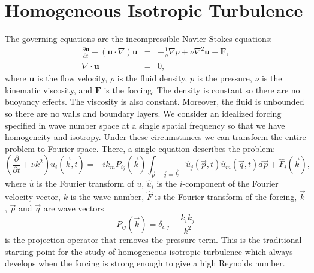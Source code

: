 \section{Homogeneous Isotropic Turbulence}

The governing equations are the incompressible Navier Stokes equations:
\begin{eqnarray}
    \frac{\partial\textbf{u}}{\partial t} + (\textbf{u}\cdot\nabla)\textbf{u} & = & -\frac{1}{\rho}\nabla p + \nu \nabla^2\textbf{u} + \textbf{F}, \\
    \nabla \cdot \textbf{u} & = & 0 , \label{eq: intro navier stokes}
\end{eqnarray}
where $\textbf{u}$ is the flow velocity, $\rho$ is the fluid density, $p$ is the pressure, $\nu$ is the kinematic viscosity, and $\textbf{F}$ is the forcing. The density is constant so there are no buoyancy effects. The viscosity is also constant.  Moreover, the fluid is unbounded so there are no walls and boundary layers.  We consider an idealized forcing specified in wave number space at a single spatial frequency so that we have homogeneity and isotropy.  Under these circumstances we can transform the entire problem to Fourier space.  There, a single equation describes the problem:
\begin{equation}
    \left(\frac{\partial}{\partial t} + \nu k^2\right)\hat{u}_i\left(\vec{k},t\right) = -ik_mP_{ij}\left(\vec{k}\right)\int_{\vec{p}+\vec{q} = \vec{k}}\hat{u}_j(\vec{p},t)\hat{u}_m(\vec{q},t)d\vec{p} + \hat{F}_i(\vec{k}), \label{eq: intro spectral navier stokes}
\end{equation}
where $\hat{u}$ is the Fourier transform of $u$, $\hat{u}_i$ is the $i$-component of the Fourier velocity vector, $k$ is the wave number, $\hat{F}$ is the Fourier transform of the forcing, $\vec{k}$, $\vec{p}$ and $\vec{q}$ are wave vectors
\begin{equation}
    P_{ij}\left(\vec{k}\right) = \delta_{i,j} - \frac{k_ik_j}{k^2}
\end{equation}
is the projection operator that removes the pressure term.  This is the traditional starting point for the study of homogeneous isotropic turbulence \cite{Batchelor, Hinze, McComb} which always develops when the forcing is strong enough to give a high Reynolds number.

